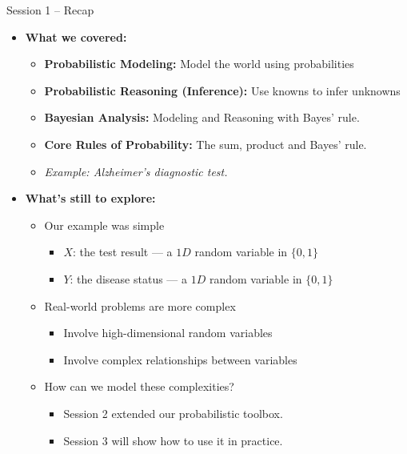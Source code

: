 \documentclass{beamer}
\begin{document}
\begin{frame}{Session 1 – Recap}
  \begin{itemize}
    \item \textbf{What we covered:}
    \begin{itemize}
      \item \textbf{Probabilistic Modeling:}
      Model the world using probabilities
      \item \textbf{Probabilistic Reasoning (Inference):}
      Use knowns to infer unknowns
      \item \textbf{Bayesian Analysis:}
      Modeling and Reasoning with Bayes’ rule.
      \item \textbf{Core Rules of Probability:}
      The sum, product and Bayes’ rule.
      \item \textit{Example: Alzheimer’s diagnostic test.}
    \end{itemize}

    \vspace{0.5cm}
    \item \textbf{What’s still to explore:}
    \begin{itemize}
    \item Our example was simple
      \begin{itemize}
        \item $X$: the test result --- a $1D$ random variable in $\{0, 1\}$
        \item $Y$: the disease status --- a $1D$ random variable in $\{0, 1\}$
      \end{itemize}
    \item Real-world problems are more complex
      \begin{itemize}
      \item Involve high-dimensional random variables
      \item Involve complex relationships between variables
      \end{itemize}
    \item How can we model these complexities?
    \begin{itemize}
      \item Session 2 extended our probabilistic toolbox.
      \item Session 3 will show how to use it in practice.
    \end{itemize}
  \end{itemize}
  \end{itemize}
\end{frame}
\end{document}
